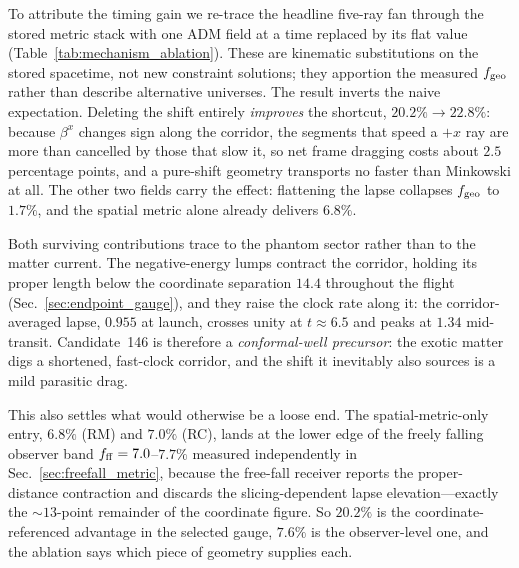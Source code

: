 \documentclass[twocolumn,floatfix,aps,prd,nofootinbib]{revtex4-2}
\begin{document}
To attribute the timing gain we re-trace the headline five-ray fan through the
stored metric stack with one ADM field at a time replaced by its flat value
(Table~\ref{tab:mechanism_ablation}). These are kinematic substitutions on the
stored spacetime, not new constraint solutions; they apportion the measured
$f_{\rm geo}$ rather than describe alternative universes. The result inverts the
naive expectation. Deleting the shift entirely \emph{improves} the shortcut,
$20.2\%\to22.8\%$: because $\beta^{x}$ changes sign along the corridor, the
segments that speed a $+x$ ray are more than cancelled by those that slow it,
so net frame dragging costs about $2.5$ percentage points, and a pure-shift
geometry transports no faster than Minkowski at all. The other two fields carry
the effect: flattening the lapse collapses $f_{\rm geo}$ to $1.7\%$, and the
spatial metric alone already delivers $6.8\%$.

Both surviving contributions trace to the phantom sector rather than to the
matter current. The negative-energy lumps contract the corridor, holding its
proper length below the coordinate separation $14.4$ throughout the flight
(Sec.~\ref{sec:endpoint_gauge}), and they raise the clock rate along it: the
corridor-averaged lapse, $0.955$ at launch, crosses unity at $t\approx6.5$ and
peaks at $1.34$ mid-transit. Candidate~146 is therefore a \emph{conformal-well
precursor}: the exotic matter digs a shortened, fast-clock corridor, and the
shift it inevitably also sources is a mild parasitic drag.

This also settles what would otherwise be a loose end. The spatial-metric-only
entry, $6.8\%$ (RM) and $7.0\%$ (RC), lands at the lower edge of the freely
falling observer band $f_{\rm ff}=7.0$--$7.7\%$ measured independently in
Sec.~\ref{sec:freefall_metric}, because the free-fall receiver reports the
proper-distance contraction and discards the slicing-dependent lapse
elevation---exactly the ${\sim}13$-point remainder of the coordinate figure.
So $20.2\%$ is the coordinate-referenced advantage in the selected gauge,
$7.6\%$ is the observer-level one, and the ablation says which piece of
geometry supplies each.
\end{document}
